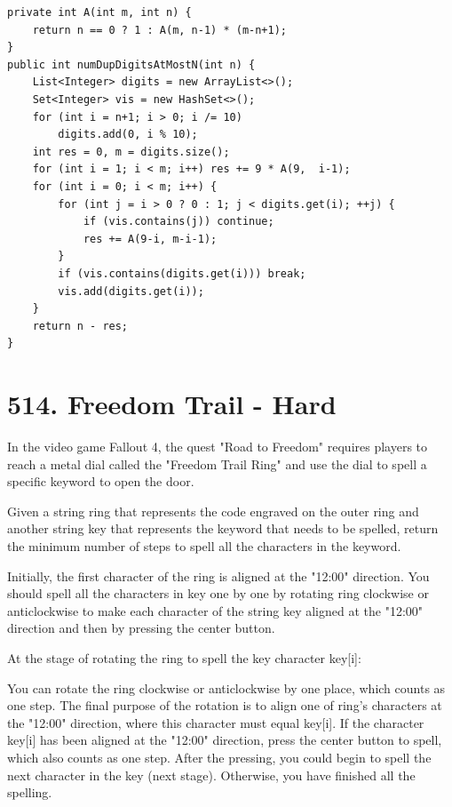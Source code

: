 \documentclass[9pt, b5paaper]{book}
\begin{document}
\begin{verbatim}
private int A(int m, int n) {
    return n == 0 ? 1 : A(m, n-1) * (m-n+1);
}
public int numDupDigitsAtMostN(int n) {
    List<Integer> digits = new ArrayList<>();
    Set<Integer> vis = new HashSet<>();
    for (int i = n+1; i > 0; i /= 10) 
        digits.add(0, i % 10);
    int res = 0, m = digits.size();
    for (int i = 1; i < m; i++) res += 9 * A(9,  i-1);
    for (int i = 0; i < m; i++) {
        for (int j = i > 0 ? 0 : 1; j < digits.get(i); ++j) {
            if (vis.contains(j)) continue;
            res += A(9-i, m-i-1);
        }
        if (vis.contains(digits.get(i))) break;
        vis.add(digits.get(i));
    }
    return n - res;
}
\end{verbatim}

\section{514. Freedom Trail - Hard}
\label{sec-2-14}
In the video game Fallout 4, the quest "Road to Freedom" requires players to reach a metal dial called the "Freedom Trail Ring" and use the dial to spell a specific keyword to open the door.

Given a string ring that represents the code engraved on the outer ring and another string key that represents the keyword that needs to be spelled, return the minimum number of steps to spell all the characters in the keyword.

Initially, the first character of the ring is aligned at the "12:00" direction. You should spell all the characters in key one by one by rotating ring clockwise or anticlockwise to make each character of the string key aligned at the "12:00" direction and then by pressing the center button.

At the stage of rotating the ring to spell the key character key[i]:

You can rotate the ring clockwise or anticlockwise by one place, which counts as one step. The final purpose of the rotation is to align one of ring's characters at the "12:00" direction, where this character must equal key[i].
If the character key[i] has been aligned at the "12:00" direction, press the center button to spell, which also counts as one step. After the pressing, you could begin to spell the next character in the key (next stage). Otherwise, you have finished all the spelling.
\end{document}

